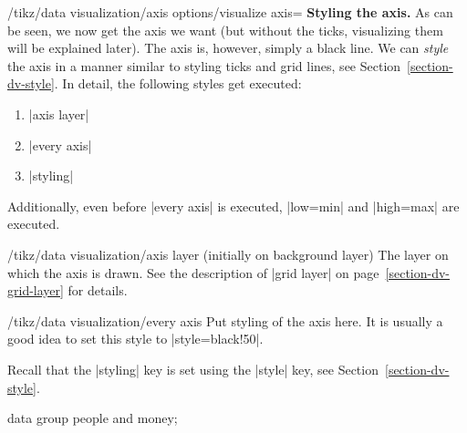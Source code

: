 \begin{key}{/tikz/data visualization/axis options/visualize axis=}
    \medskip
    \textbf{Styling the axis.}
    As can be seen, we now get the axis we want (but without the ticks,
    visualizing them will be explained later). The axis is, however, simply a
    black line. We can \emph{style} the axis in a manner similar to styling
    ticks and grid lines, see Section~\ref{section-dv-style}. In detail, the
    following styles get executed:
    \begin{enumerate}
        \item |axis layer|
        \item |every axis|
        \item |styling|
    \end{enumerate}
    Additionally, even before |every axis| is executed, |low=min| and
    |high=max| are executed.

    \begin{stylekey}{/tikz/data visualization/axis layer (initially on background layer)}
        The layer on which the axis is drawn. See the description of
        |grid layer| on page~\ref{section-dv-grid-layer} for details.
    \end{stylekey}

    \begin{stylekey}{/tikz/data visualization/every axis}
        Put styling of the axis here. It is usually a good idea to set this
        style to |style={black!50}|.
    \end{stylekey}

    Recall that the |styling| key is set using the |style| key, see
    Section~\ref{section-dv-style}.
\tikzset{
}
\begin{codeexample}[]
\tikz \datavisualization [
    our system,
    x axis={attribute=time, length=4cm},
    left axis ={attribute=money},
    right axis={attribute=people},
    visualize as line/.list={people 1, people 2, money 1, money 2}]
  data group {people and money};
\end{codeexample}



\end{key}
